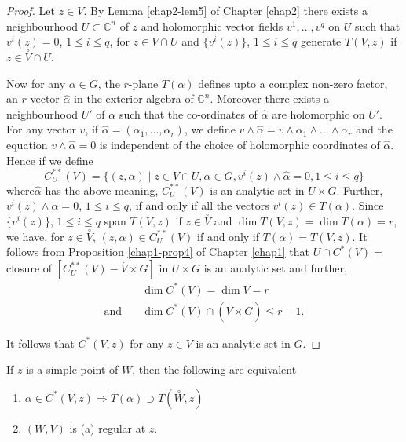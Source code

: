 \begin{proof} %
  Let $z\in V$. By Lemma \ref{chap2-lem5} of Chapter \ref{chap2} there exists a
  neighbourhood $U \subset \mathbb{C}^n$ of $z$ and holomorphic
  vector fields $v^1,\ldots,v^q$ on $U$ such that $v^i(z) = 0$, $1 \leq i
  \leq q$, for $z\in \overset{.}{V} \cap U$ and
  $\{v^i(z)\}$, $1\leq i\leq q$ generate $T(V,z)$ if
  $z\in \overset{\circ}{V}\cap U$.  

Now for any $\alpha \in G$, the $r$-plane $T (\alpha)$ defines upto
a complex non-zero factor, an $r$-vector $\widehat{\alpha}$ in the exterior
algebra of  $\mathbb{C}^n$. Moreover there exists a neighbourhood
$U'$ of $\alpha$ such that the co-ordinates of $\widehat{\alpha}$ are
holomorphic on $U'$. For any vector $v$, if
$\widehat{\alpha}=(\alpha_1,\ldots,\alpha_r)$, we define $v \wedge
\widehat{\alpha}= v \wedge\alpha_1\wedge\ldots \wedge \alpha_r$ and the
equation $v\wedge\widehat{\alpha}=0$ is independent of the choice of
holomorphic coordinates of $\widehat{\alpha}$. Hence if we define 
$$
C_U^{**}(V) = \bigg\{(z,\alpha)\mid z \in V \cap U, \alpha
\in G, v^i(z)\wedge \widehat{\alpha} = 0,1\leq i \leq q\bigg\} 
$$ 
where\pageoriginale $\widehat{\alpha}$ has the above meaning,
$C^{**}_U (V)$ is an 
analytic set in $U\times G$. Further, $v^i(z)\wedge \alpha = 0$, $1\leq
i\leq q$, if and only if all the vectors $v^i(z)\in
T(\alpha)$. Since $\{v^i(z)\}$, $1\leq i\leq q$ span $T(V,z)$ if
$z \in \overset{\circ}{V}$ and $\dim T(V,z)=\dim T(\alpha) = r$, we
have, for $z\in \overset{\circ}{V}$, $(z,\alpha) \in
C^{**}_U(V)$ if and only if $T(\alpha) = T(V,z)$. It follows from
Proposition \ref{chap1-prop4} of Chapter \ref{chap1} that $U \cap
C^{*}(V)=$  closure of 
$[C^{**}_U(V)-\overset{.}{V}\times G]$ in $U\times G$ is an
analytic set and further, 
\begin{align*} 
                 & \dim C^\ast (V) = \dim V = r\\
  \text{and}\quad & \dim C^\ast (V)\cap (\overset{.}{V}\times G)\leq r-1.
\end{align*}

It follows that $C^\ast(V,z)$ for any $z\in V$ is an analytic set
in $G$.  
\end{proof}

\begin{lemma}\label{chap3-lem3} %
If $z$ is a simple point of $W$, then the following are equivalent
  \begin{enumerate}[\rm(1)]
  \item $\alpha \in C^*(V,z)\Rightarrow T(\alpha)\supset
    T(\overset{\circ}{W},z)$ 

  \item $(W,V)$ is (a) regular at $z$.
  \end{enumerate}
\end{lemma}

